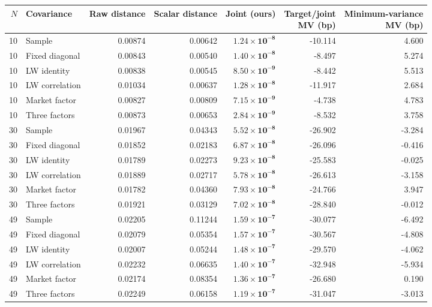 \begin{tabular}{rlrrrrr}\toprule
$N$ & Covariance & Raw distance & Scalar distance & \textbf{Joint (ours)} & \shortstack{Target/joint\\MV (bp)} & \shortstack{Minimum-variance\\MV (bp)}\\\midrule
10 & Sample & 0.00874 & 0.00642 & $\mathbf{1.24\times10^{-8}}$ & -10.114 & 4.600 \\
10 & Fixed diagonal & 0.00843 & 0.00540 & $\mathbf{1.40\times10^{-8}}$ & -8.497 & 5.274 \\
10 & LW identity & 0.00838 & 0.00545 & $\mathbf{8.50\times10^{-9}}$ & -8.442 & 5.513 \\
10 & LW correlation & 0.01034 & 0.00637 & $\mathbf{1.28\times10^{-8}}$ & -11.917 & 2.684 \\
10 & Market factor & 0.00827 & 0.00809 & $\mathbf{7.15\times10^{-9}}$ & -4.738 & 4.783 \\
10 & Three factors & 0.00873 & 0.00653 & $\mathbf{2.84\times10^{-9}}$ & -8.532 & 3.758 \\
\midrule
30 & Sample & 0.01967 & 0.04343 & $\mathbf{5.52\times10^{-8}}$ & -26.902 & -3.284 \\
30 & Fixed diagonal & 0.01852 & 0.02183 & $\mathbf{6.87\times10^{-8}}$ & -26.096 & -0.416 \\
30 & LW identity & 0.01789 & 0.02273 & $\mathbf{9.23\times10^{-8}}$ & -25.583 & -0.025 \\
30 & LW correlation & 0.01889 & 0.02717 & $\mathbf{5.78\times10^{-8}}$ & -26.613 & -3.158 \\
30 & Market factor & 0.01782 & 0.04360 & $\mathbf{7.93\times10^{-8}}$ & -24.766 & 3.947 \\
30 & Three factors & 0.01921 & 0.03129 & $\mathbf{7.02\times10^{-8}}$ & -28.840 & -0.012 \\
\midrule
49 & Sample & 0.02205 & 0.11244 & $\mathbf{1.59\times10^{-7}}$ & -30.077 & -6.492 \\
49 & Fixed diagonal & 0.02079 & 0.05354 & $\mathbf{1.57\times10^{-7}}$ & -30.567 & -4.808 \\
49 & LW identity & 0.02007 & 0.05244 & $\mathbf{1.48\times10^{-7}}$ & -29.570 & -4.062 \\
49 & LW correlation & 0.02232 & 0.06635 & $\mathbf{1.40\times10^{-7}}$ & -32.948 & -5.934 \\
49 & Market factor & 0.02174 & 0.08354 & $\mathbf{1.36\times10^{-7}}$ & -26.680 & 0.190 \\
49 & Three factors & 0.02249 & 0.06158 & $\mathbf{1.19\times10^{-7}}$ & -31.047 & -3.013 \\
\bottomrule\end{tabular}
